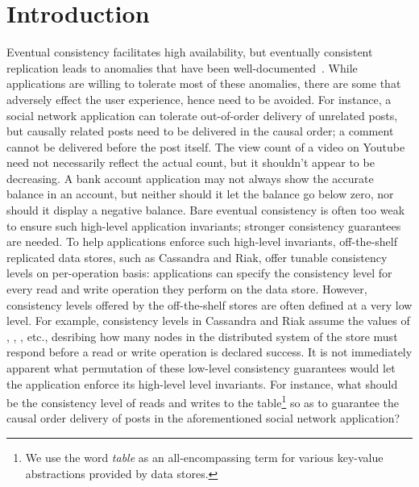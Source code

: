 \section{Introduction}
\label{sec:intro}

Eventual consistency facilitates high availability, but eventually consistent
replication leads to anomalies that have been
well-documented~\cite{Burckhardt2014, pldi15, Session, Dynamo, RedBlue}. While
applications are willing to tolerate most of these anomalies, there are some
that adversely effect the user experience, hence need to be avoided. For
instance, a social network application can tolerate out-of-order delivery of
unrelated posts, but causally related posts need to be delivered in the causal
order; a comment cannot be delivered before the post itself. The view count of
a video on Youtube need not necessarily reflect the actual count, but it
shouldn't appear to be decreasing. A bank account application may not always
show the accurate balance in an account, but neither should it let the balance
go below zero, nor should it display a negative balance. Bare eventual
consistency is often too weak to ensure such high-level application
invariants; stronger consistency guarantees are needed. To help applications
enforce such high-level invariants, off-the-shelf replicated data stores, such
as Cassandra and Riak, offer tunable consistency levels on per-operation
basis: applications can specify the consistency level for every read and write
operation they perform on the data store. However, consistency levels offered
by the off-the-shelf stores are often defined at a very low level. For
example, consistency levels in Cassandra and Riak assume the values of
, , ,  etc., desribing how many nodes in the
distributed system of the store must respond before a read or write operation
is declared success. It is not immediately apparent what permutation of these
low-level consistency guarantees would let the application enforce its
high-level level invariants. For instance, what should be the consistency
level of reads and writes to the  table\footnote{We use the word
\emph{table} as an all-encompassing term for various key-value abstractions
provided by data stores.} so as to guarantee the causal order delivery of
posts in the aforementioned social network application? 

